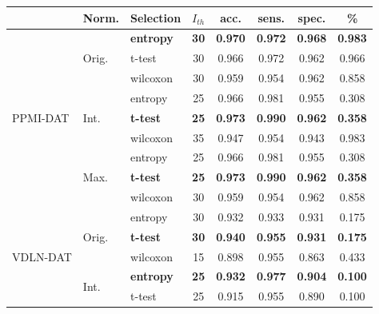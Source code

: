 \begin{table}[htp]
	\centering
\begin{tabular}{lllccccc}
	\toprule
	                          & Norm.                  & Selection & $I_{th}$ & acc.  & sens. & spec. &  \%   \\ \midrule
	\multirow{9}{*}{PPMI-DAT} & \multirow{3}{*}{Orig.} & \textbf{entropy}   &    \textbf{30}    & \textbf{0.970} & \textbf{0.972} & \textbf{0.968} & \textbf{0.983} \\
	                          &                        & t-test    &    30    & 0.966 & 0.972 & 0.962 & 0.966 \\
	                          &                        & wilcoxon  &    30    & 0.959 & 0.954 & 0.962 & 0.858 \\ \cline{2-8}
	                          & \multirow{3}{*}{Int.}  & entropy   &    25    & 0.966 & 0.981 & 0.955 & 0.308 \\
	                          &                        & \textbf{t-test }   &    \textbf{25}    & \textbf{0.973} & \textbf{0.990 }& \textbf{0.962} &\textbf{ 0.358} \\
	                          &                        & wilcoxon  &    35    & 0.947 & 0.954 & 0.943 & 0.983 \\ \cline{2-8}
	                          & \multirow{3}{*}{Max.}  & entropy   &    25    & 0.966 & 0.981 & 0.955 & 0.308 \\
	                          &                        & \textbf{t-test}    &    \textbf{25}    &\textbf{ 0.973} & \textbf{0.990} & \textbf{0.962} & \textbf{0.358} \\
	                          &                        & wilcoxon  &    30    & 0.959 & 0.954 & 0.962 & 0.858 \\ \midrule
	\multirow{9}{*}{VDLN-DAT} & \multirow{3}{*}{Orig.} & entropy   &    30    & 0.932 & 0.933 & 0.931 & 0.175 \\
	                          &                        &\textbf{ t-test}    &    \textbf{30}    & \textbf{0.940} & \textbf{0.955} & \textbf{0.931} & \textbf{0.175} \\
	                          &                        & wilcoxon  &    15    & 0.898 & 0.955 & 0.863 & 0.433 \\ \cline{2-8}
	                          & \multirow{3}{*}{Int.}  & \textbf{entropy}   &    \textbf{25}    & \textbf{0.932} & \textbf{0.977} & \textbf{0.904} & \textbf{0.100} \\
	                          &                        & t-test    &    25    & 0.915 & 0.955 & 0.890 & 0.100 \\

\end{tabular}
\end{table}
